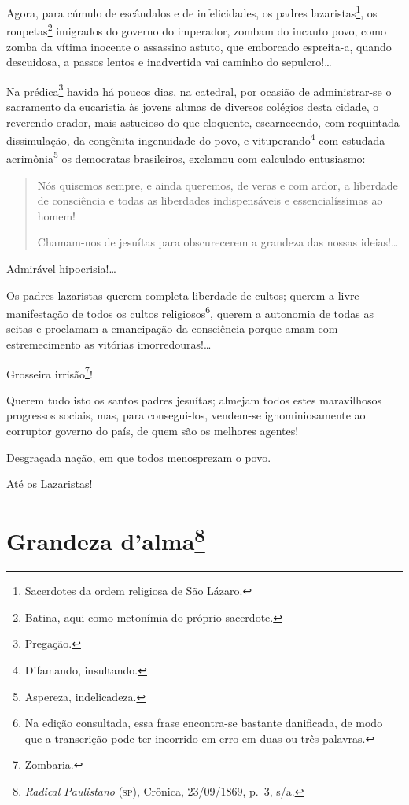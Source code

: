Agora, para cúmulo de escândalos e de infelicidades, os padres
lazaristas\footnote{Sacerdotes da ordem religiosa de São Lázaro.}, os
roupetas\footnote{Batina, aqui como metonímia do próprio sacerdote.}
imigrados do governo do imperador, zombam do incauto povo, como zomba da
vítima inocente o assassino astuto, que emborcado espreita-a, quando
descuidosa, a passos lentos e inadvertida vai caminho do sepulcro!\ldots{}

Na prédica\footnote{Pregação.} havida há poucos dias, na catedral, por
ocasião de administrar-se o sacramento da eucaristia às jovens alunas de
diversos colégios desta cidade, o reverendo orador, mais astucioso do
que eloquente, escarnecendo, com requintada dissimulação, da congênita
ingenuidade do povo, e vituperando\footnote{Difamando, insultando.}
com estudada acrimônia\footnote{Aspereza, indelicadeza.} os democratas
brasileiros, exclamou com calculado entusiasmo:


\begin{quote}
Nós quisemos sempre, e ainda queremos, de veras e com ardor, a
liberdade de consciência e todas as liberdades indispensáveis e
essencialíssimas ao homem!

Chamam-nos de jesuítas para obscurecerem a grandeza das nossas
ideias!\ldots{}
\end{quote}

Admirável hipocrisia!\ldots{}

Os padres lazaristas querem completa liberdade de cultos; querem a livre
manifestação de todos os cultos religiosos\footnote{Na edição
  consultada, essa frase encontra-se bastante danificada, de modo que a
  transcrição pode ter incorrido em erro em duas ou três palavras.},
querem a autonomia de todas as seitas e proclamam a emancipação da
consciência porque amam com estremecimento as vitórias
imorredouras!\ldots

Grosseira irrisão\footnote{Zombaria.}!

Querem tudo isto os santos padres jesuítas; almejam todos estes
maravilhosos progressos sociais, mas, para consegui-los, vendem-se
ignominiosamente ao corruptor governo do país, de quem são os melhores
agentes!

Desgraçada nação, em que todos menosprezam o povo.

Até os Lazaristas!

\chapter{Grandeza d'alma\footnote{\emph{Radical Paulistano} (\textsc{sp}),
  Crônica, 23/09/1869, p.~3, s/a.}}

